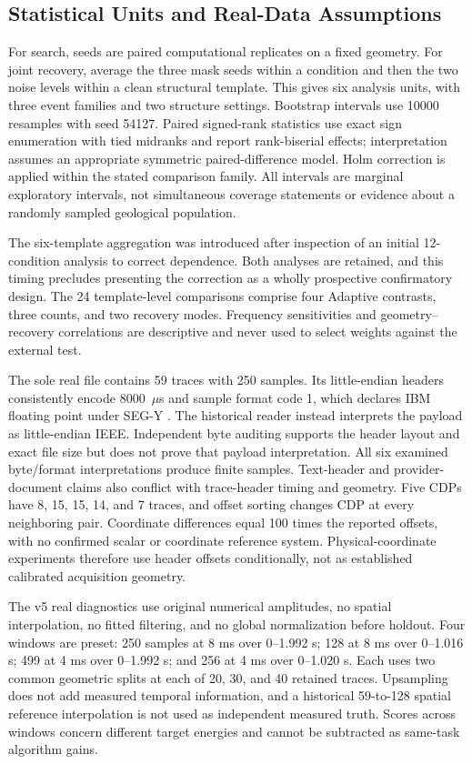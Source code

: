 \documentclass[journal]{IEEEtran}
\begin{document}
\subsection{Statistical Units and Real-Data Assumptions}
For search, seeds are paired computational replicates on a fixed geometry. For joint recovery, average the three mask seeds within a condition and then the two noise levels within a clean structural template. This gives six analysis units, with three event families and two structure settings. Bootstrap intervals use 10000 resamples with seed 54127. Paired signed-rank statistics use exact sign enumeration with tied midranks and report rank-biserial effects; interpretation assumes an appropriate symmetric paired-difference model. Holm correction \cite{holm} is applied within the stated comparison family. All intervals are marginal exploratory intervals, not simultaneous coverage statements or evidence about a randomly sampled geological population.

The six-template aggregation was introduced after inspection of an initial 12-condition analysis to correct dependence. Both analyses are retained, and this timing precludes presenting the correction as a wholly prospective confirmatory design. The 24 template-level comparisons comprise four Adaptive contrasts, three counts, and two recovery modes. Frequency sensitivities and geometry--recovery correlations are descriptive and never used to select weights against the external test.

The sole real file contains 59 traces with 250 samples. Its little-endian headers consistently encode 8000~$\mu$s and sample format code 1, which declares IBM floating point under SEG-Y \cite{segy}. The historical reader instead interprets the payload as little-endian IEEE. Independent byte auditing supports the header layout and exact file size but does not prove that payload interpretation. All six examined byte/format interpretations produce finite samples. Text-header and provider-document claims also conflict with trace-header timing and geometry. Five CDPs have 8, 15, 15, 14, and 7 traces, and offset sorting changes CDP at every neighboring pair. Coordinate differences equal 100 times the reported offsets, with no confirmed scalar or coordinate reference system. Physical-coordinate experiments therefore use header offsets conditionally, not as established calibrated acquisition geometry.

The v5 real diagnostics use original numerical amplitudes, no spatial interpolation, no fitted filtering, and no global normalization before holdout. Four windows are preset: 250 samples at 8 ms over 0--1.992 s; 128 at 8 ms over 0--1.016 s; 499 at 4 ms over 0--1.992 s; and 256 at 4 ms over 0--1.020 s. Each uses two common geometric splits at each of 20, 30, and 40 retained traces. Upsampling does not add measured temporal information, and a historical 59-to-128 spatial reference interpolation is not used as independent measured truth. Scores across windows concern different target energies and cannot be subtracted as same-task algorithm gains.
\end{document}

